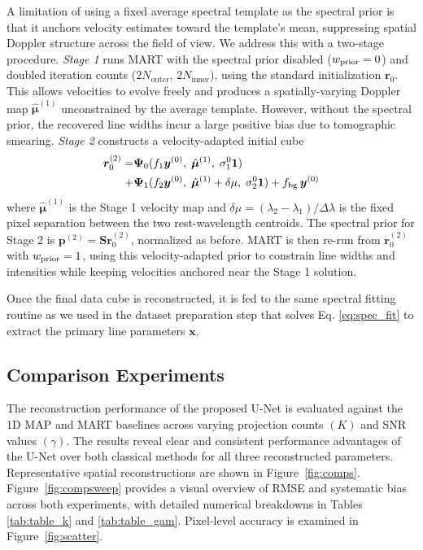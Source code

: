 \documentclass[linenumbers,twocolumn]{aastex7}
\begin{document}
A limitation of using a fixed average spectral template as the spectral prior is
that it anchors velocity estimates toward the template's mean, suppressing
spatial Doppler structure across the field of view. We address this with a
two-stage procedure. \textit{Stage 1} runs MART with the spectral prior disabled
($w_{\rm prior}=0$) and doubled iteration counts ($2N_\text{outer}$,
$2N_\text{inner}$), using the standard initialization $\bm r_0$. This allows
velocities to evolve freely and produces a spatially-varying Doppler map
$\hat{\bm \mu}^{(1)}$ unconstrained by the average template. However, without
the spectral prior, the recovered line widths incur a large positive bias due
to tomographic smearing. \textit{Stage 2} constructs a velocity-adapted initial cube
\begin{align}
\bm r_0^{(2)} =& \bm \Psi_0(f_1 \bm y^{(0)},\; \hat{\bm \mu}^{(1)},\; \sigma_1^0 \bm 1)
\nonumber\\
              +& \bm \Psi_1(f_2 \bm y^{(0)},\; \hat{\bm \mu}^{(1)} +
              \delta\mu,\; \sigma_2^0 \bm 1) + f_{\rm bg}\, \bm y^{(0)}
\nonumber\\
\end{align}
where $\hat{\bm \mu}^{(1)}$ is the Stage 1 velocity map and
$\delta\mu = (\lambda_2 - \lambda_1)/\Delta\lambda$ is the fixed pixel
separation between the two rest-wavelength centroids. The spectral prior for
Stage 2 is $\bm p^{(2)} = \bm S \bm r_0^{(2)}$, normalized as before. MART is
then re-run from $\bm r_0^{(2)}$ with $w_{\rm prior}=1$, using this
velocity-adapted prior to constrain line widths and intensities while keeping
velocities anchored near the Stage 1 solution.

Once the final data cube is reconstructed, it is fed to the same spectral
fitting routine as we used in the dataset preparation step that solves Eq.
\eqref{eq:spec_fit} to extract the primary line parameters $\bm x$.

\subsection{Comparison Experiments} 
The reconstruction performance of the proposed U-Net is evaluated against the 1D
MAP and MART baselines across varying projection counts $(K)$ and SNR values 
$(\gamma)$. The results reveal clear and consistent performance advantages of
the U-Net over both classical methods for all three reconstructed parameters.
Representative spatial reconstructions are shown in Figure~\ref{fig:comps}.
Figure~\ref{fig:compsweep} provides a visual overview of RMSE and systematic
bias across both experiments, with detailed numerical breakdowns in Tables
\ref{tab:table_k} and \ref{tab:table_gam}. Pixel-level accuracy is examined in
Figure~\ref{fig:scatter}.
\end{document}
